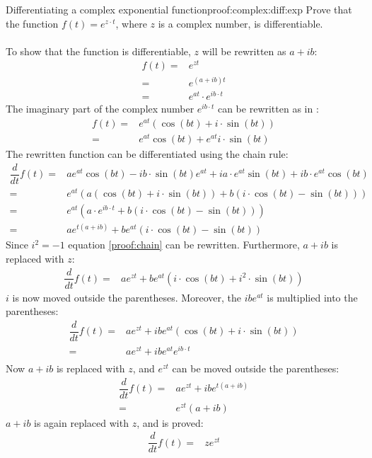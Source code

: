 \begin{prof}{Differentiating a complex exponential function}{proof:complex:diff:exp}
Prove that the function $f(t)=e^{z\cdot t}$, where $z$ is a complex number, is differentiable.
\\ \\
To show that the function is differentiable, $z$ will be rewritten as $a+ ib$:
\begin{align*}
	f(t) =& e^{zt} \\
		 =& e^{(a+ib)t} \\
		 =& e^{at} \cdot e^{ib\cdot t}
\end{align*}
The imaginary part of the complex number $e^{ib\cdot t}$ can be rewritten as in :
\begin{align*}
	f(t) =& e^{at}\left(\cos(bt)+i \cdot \sin(bt)\right) \\
		 =& e^{at}\cos(bt) + e^{at} i \cdot \sin(bt)
\end{align*}
The rewritten function can be differentiated using the chain rule:
\begin{align}
	\dfrac{d}{dt}f(t) =& ae^{at}\cos(bt) -ib \cdot \sin(bt)e^{at} + ia \cdot e^{at}\sin(bt) + ib \cdot e^{at}\cos(bt) \nonumber \\
	=& e^{at} \left( a(\cos(bt) + i \cdot \sin(bt)) + b(i \cdot \cos(bt) - \sin(bt)) \right) \nonumber \\
	=& e^{at}(a \cdot e^{ib \cdot t}+b(i \cdot \cos(bt) - \sin(bt))) \nonumber \\
	=& a e^{t(a+ib)} + b e^{at}(i \cdot \cos(bt) - \sin(bt)) \label{proof:chain}
\end{align}
Since $i^2 = -1$ equation \eqref{proof:chain} can be rewritten. Furthermore, $a+ib$ is replaced with $z$:
\begin{align*}
	\dfrac{d}{dt}f(t) =& a e^{zt} + b e^{at}(i \cdot \cos(bt) + i^2 \cdot \sin(bt))
\end{align*}
$i$ is now moved outside the parentheses. Moreover, the $ib e^{at}$ is multiplied into the parentheses:
\begin{align*}
	\dfrac{d}{dt}f(t) =&  a e^{zt} + ib e^{at}(\cos(bt) + i \cdot \sin(bt)) \\
	=&  a e^{zt} + ib e^{at}e^{ib \cdot t} \\
\end{align*}
Now $a+ib$ is replaced with $z$, and $e^{zt}$ can be moved outside the parentheses:
\begin{align*}
	\dfrac{d}{dt}f(t) =&  a e^{zt} + ib e^{t(a+ib)} \\
	=&  e^{zt}(a+ib)
\end{align*}
$a+ib$ is again replaced with $z$, and  is proved:
\begin{align*}
	\dfrac{d}{dt}f(t) =&  ze^{zt}
\end{align*}
\end{prof}
